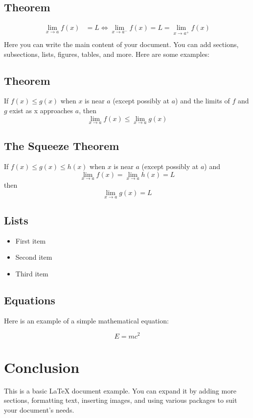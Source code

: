 \documentclass{article}
\begin{document}
\subsection*{Theorem}
\begin{align*}
\lim_{x \to a} f(x) &= L \Leftrightarrow \lim_{x \to a^-} f(x) = L = \lim_{x \to a^+} f(x) \\
\end{align*}
Here you can write the main content of your document. You can add sections, subsections, lists, figures, tables, and more. Here are some examples:

\subsection*{Theorem}
If \( f(x) \leq g(x) \) when \( x \) is near \( a \) (except possibly at \( a \)) and the limits of \( f \) and \( g \) exist as x approaches \( a \), then
\[
\lim_{x \to a} f(x) \leq \lim_{x \to a} g(x)
\]

\subsection*{The Squeeze Theorem}
If \( f(x) \leq g(x) \leq h(x)\) when \( x \) is near \( a \) (except possibly at \( a \)) and
\[
\lim_{x \to a} f(x) = \lim_{x \to a} h(x) = L
\]
then
\[
\lim_{x \to a} g(x) = L
\]

\subsection{Lists}
\begin{itemize}
    \item First item
    \item Second item
    \item Third item
\end{itemize}

\subsection{Equations}
Here is an example of a simple mathematical equation:

\begin{equation}
    E = mc^2
\end{equation}

\section{Conclusion}
This is a basic LaTeX document example. You can expand it by adding more sections, formatting text, inserting images, and using various packages to suit your document's needs.
\end{document}
